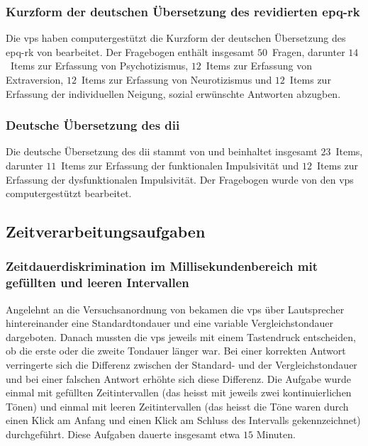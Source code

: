 \documentclass[11pt, twoside, a4paper]{book}		%
\begin{document}
\subsubsection*{Kurzform der deutschen Übersetzung des revidierten \gls{epq-rk}}
Die \glspl{vp} haben  computergestützt die Kurzform der deutschen Übersetzung des \gls{epq-rk} von \citet{Ruch1999} bearbeitet. Der Fragebogen enthält insgesamt $50$~Fragen, darunter $14$~Items zur Erfassung von Psychotizismus, $12$~Items zur Erfassung von Extraversion, $12$~Items zur Erfassung von Neurotizismus und $12$~Items zur Erfassung der individuellen Neigung, sozial erwünschte Antworten abzugben.

\subsubsection*{Deutsche Übersetzung des \gls{dii}}
Die deutsche Übersetzung des \gls{dii} stammt von \citet{Kuhmann1996} und beinhaltet insgesamt $23$~Items, darunter $11$~Items zur Erfassung der funktionalen Impulsivität und  $12$~Items zur Erfassung der dysfunktionalen Impulsivität. Der Fragebogen wurde von den \glspl{vp} computergestützt bearbeitet.

\subsection{Zeitverarbeitungsaufgaben}


\subsubsection*{Zeitdauerdiskrimination im Millisekundenbereich mit gefüllten und leeren Intervallen}

Angelehnt an die Versuchsanordnung von \citet{Stauffer2011} bekamen die \glspl{vp} über Lautsprecher hintereinander eine Standardtondauer und eine variable Vergleichstondauer dargeboten. Danach mussten die \glspl{vp} jeweils mit einem Tastendruck entscheiden, ob die erste oder die zweite Tondauer länger war. Bei einer korrekten Antwort verringerte sich die Differenz zwischen der Standard- und der Vergleichstondauer und bei einer falschen Antwort erhöhte sich diese Differenz. Die Aufgabe wurde einmal mit gefüllten Zeitintervallen (das heisst mit jeweils zwei kontinuierlichen Tönen) und einmal mit leeren Zeitintervallen (das heisst die Töne waren durch einen Klick am Anfang und einen Klick am Schluss des Intervalls gekennzeichnet) durchgeführt. Diese Aufgaben dauerte insgesamt etwa $15$ Minuten.
\end{document}

